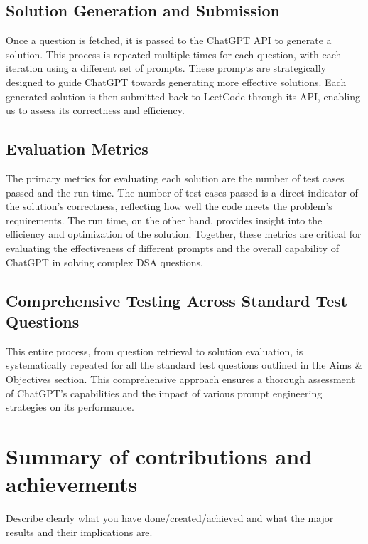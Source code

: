 \subsection{Solution Generation and Submission}
\label{sec:intro_some_sub2}
Once a question is fetched, it is passed to the ChatGPT API to generate a solution. This process is repeated multiple times for each question, with each iteration using a different set of prompts. These prompts are strategically designed to guide ChatGPT towards generating more effective solutions. Each generated solution is then submitted back to LeetCode through its API, enabling us to assess its correctness and efficiency.

\subsection{Evaluation Metrics}
\label{sec:intro_some_subsub1}
The primary metrics for evaluating each solution are the number of test cases passed and the run time. The number of test cases passed is a direct indicator of the solution's correctness, reflecting how well the code meets the problem's requirements. The run time, on the other hand, provides insight into the efficiency and optimization of the solution. Together, these metrics are critical for evaluating the effectiveness of different prompts and the overall capability of ChatGPT in solving complex DSA questions.

\subsection{ Comprehensive Testing Across Standard Test Questions}
\label{sec:intro_some_subsub2}
This entire process, from question retrieval to solution evaluation, is systematically repeated for all the standard test questions outlined in the Aims \& Objectives section. This comprehensive approach ensures a thorough assessment of ChatGPT’s capabilities and the impact of various prompt engineering strategies on its performance.

\section{Summary of contributions and achievements} %
\label{sec:intro_sum_results} %
Describe clearly what you have done/created/achieved and what the major results and their implications are. 


